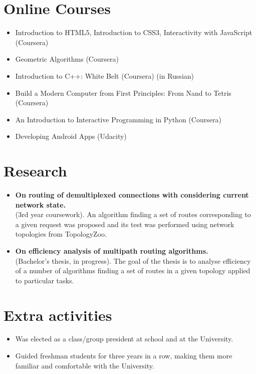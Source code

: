 \documentclass[11pt,a4paper,roman]{moderncv}
\begin{document}
\section{Online Courses}
\begin{multicols}{2}
\begin{itemize}
    \item Introduction to HTML5, Introduction to CSS3, Interactivity with JavaScript (Coursera)
    \item Geometric Algorithms (Coursera)
    \item Introduction to C++: White Belt (Coursera) (in Russian)
    \item Build a Modern Computer from First Principles: From Nand to Tetris (Coursera)
    \item An Introduction to Interactive Programming in Python (Coursera)
    \item Developing Android Apps (Udacity)
  \end{itemize}
\end{multicols}


\section{Research}
  {\begin{itemize}
   \item \textbf{On routing of demultiplexed connections with considering current network state.}\\
   (3rd year coursework). An algorithm finding a set of routes corresponding to a given request was proposed and its test was performed using network topologies from TopologyZoo.

   \item \textbf{On efficiency analysis of multipath routing algorithms.}\\
   (Bachelor's thesis, in progress). The goal of the thesis is to analyse efficiency of a number of algorithms finding a set of routes in a given topology applied to particular tasks.
 \end{itemize}
}


\section{Extra activities}
   	\begin{itemize}
         \item Was elected as a class/group president at school and at the University.
         \item Guided freshman students for three years in a row, making them more familiar and comfortable with the University.
	\end{itemize}
\end{document}
